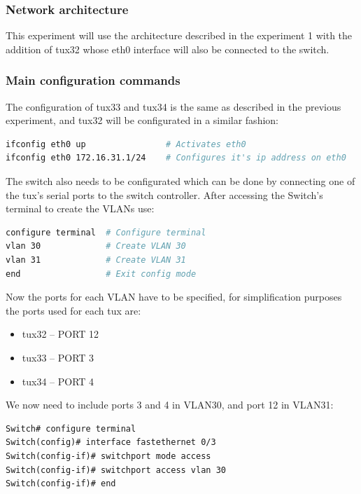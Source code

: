 \documentclass[a4paper,11pt,english]{article}
\begin{document}
        \subsubsection{Network architecture}
            This experiment will use the architecture described in the experiment 1 with the
            addition of tux32 whose eth0 interface will also be connected to the switch.

        \subsubsection{Main configuration commands}
            The configuration of tux33 and tux34 is the same as described in the previous
            experiment, and tux32 will be configurated in a similar fashion:

\begin{lstlisting}[language=sh]
ifconfig eth0 up                # Activates eth0
ifconfig eth0 172.16.31.1/24    # Configures it's ip address on eth0
\end{lstlisting}

            The switch also needs to be configurated which can be done by connecting one of
            the tux's serial ports to the switch controller. After accessing the Switch's
            terminal to create the VLANs use:

\begin{lstlisting}[language=sh]
configure terminal  # Configure terminal
vlan 30             # Create VLAN 30
vlan 31             # Create VLAN 31
end                 # Exit config mode
\end{lstlisting}

            Now the ports for each VLAN have to be specified, for simplification purposes
            the ports used for each tux are: %

            \begin{itemize}
                \item tux32 -- PORT 12
                \item tux33 -- PORT 3
                \item tux34 -- PORT 4
            \end{itemize}

            We now need to include ports 3 and 4 in VLAN30, and port 12 in VLAN31:

\begin{lstlisting}[caption=Adding port 3 to VLAN30]
Switch# configure terminal
Switch(config)# interface fastethernet 0/3
Switch(config-if)# switchport mode access
Switch(config-if)# switchport access vlan 30
Switch(config-if)# end
\end{lstlisting}
\end{document}
